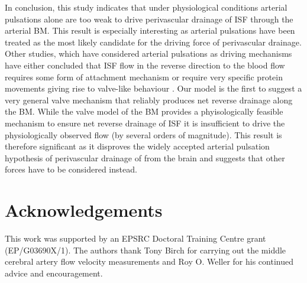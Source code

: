\documentclass[a4paper,titlepage]{scrartcl}
\begin{document}
In conclusion, this study indicates that under physiological conditions arterial pulsations alone are too weak to drive perivascular drainage of ISF through the arterial BM. This result is especially interesting as arterial pulsations have been treated as the most likely candidate for the driving force of perivascular drainage. Other studies, which have considered arterial pulsations as driving mechanisms have either concluded that ISF flow in the reverse direction to the blood flow requires some form of attachment mechanism \cite{Schley2006,Wang2011} or require very specific protein movements giving rise to valve-like behaviour \cite{Sharp2015}. Our model is the first to suggest a very general valve mechanism that reliably produces net reverse drainage along the BM. While the valve model of the BM provides a phyisologically feasible mechanism to ensure net reverse drainage of ISF it is insufficient to drive the physiologically observed flow (by several orders of magnitude). This result is therefore significant as it disproves the widely accepted arterial pulsation hypothesis of perivascular drainage of \Ab from the brain \cite{Weller2009,Carare2008,Hawkes2011,Morris2014,Schley2006,Attems2011,Wang2011,Iliff2012,Asgari2015,Sharp2015,Weller2015a} and suggests that other forces have to be considered instead.

\section*{Acknowledgements}

This work was supported by an EPSRC Doctoral Training Centre grant (EP/G03690X/1). The authors thank Tony Birch for carrying out the middle cerebral artery flow velocity measurements and Roy O. Weller for his continued advice and encouragement.

%
%

\end{document}
